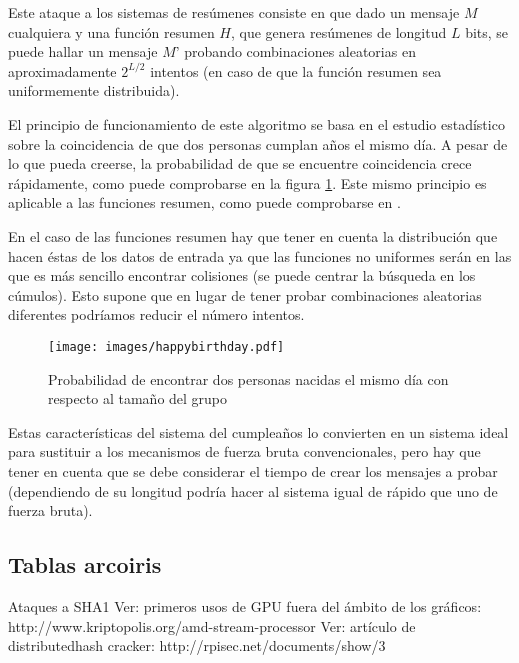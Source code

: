 Este ataque a los sistemas de resúmenes consiste en que dado un mensaje $M$ cualquiera y una función resumen $H$, que genera resúmenes de longitud $L$ bits, se puede hallar un mensaje $M’$ probando combinaciones aleatorias en aproximadamente $2^{L/2}$ intentos \cite{website:wastahf} (en caso de que la función resumen sea uniformemente distribuida).

El principio de funcionamiento de este algoritmo se basa en el estudio estadístico sobre la coincidencia de que dos personas cumplan años el mismo día. A pesar de lo que pueda creerse, la probabilidad de que se encuentre coincidencia crece rápidamente, como puede comprobarse en la figura \ref{fig:Birthday}. Este mismo principio es aplicable a las funciones resumen, como puede comprobarse en \cite{Bellare04hashfunction}.

En el caso de las funciones resumen hay que tener en cuenta la distribución que hacen éstas de los datos de entrada ya que las funciones no uniformes serán en las que es más sencillo encontrar colisiones (se puede centrar la búsqueda en los cúmulos). Esto supone que en lugar de tener probar   combinaciones aleatorias diferentes podríamos reducir el número intentos.
 
\begin{figure}
	\centering
	\texttt{[image: images/happybirthday.pdf]}
	\caption{Probabilidad de encontrar dos personas nacidas el mismo día con respecto al tamaño del grupo}\label{fig:Birthday}
\end{figure}

Estas características del sistema del cumpleaños lo convierten en un sistema ideal para sustituir a los mecanismos de fuerza bruta convencionales, pero hay que tener en cuenta que se debe considerar el tiempo de crear los mensajes a probar (dependiendo de su longitud podría hacer al sistema igual de rápido que uno de fuerza bruta).

\subsection{Tablas arcoiris}

Ataques a SHA1
Ver: primeros usos de GPU fuera del ámbito de los gráficos: http://www.kriptopolis.org/amd-stream-processor
Ver: artículo de distributedhash cracker: http://rpisec.net/documents/show/3


